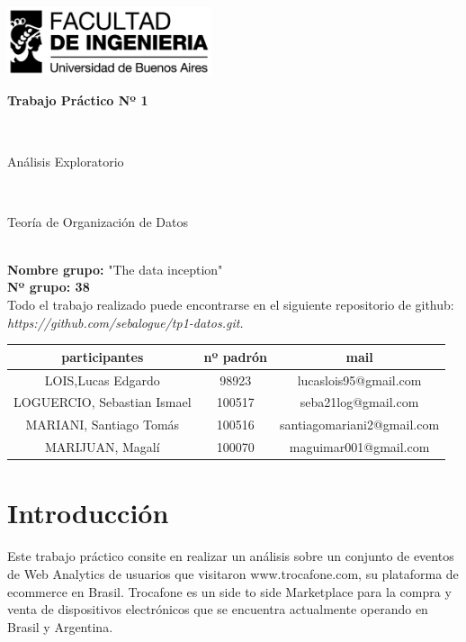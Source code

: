 \documentclass[titlepage,a4paper]{article}
\begin{document}
	\begin{titlepage}
		\hfill\includegraphics[width=6cm]{logofiuba.jpg}
		\center
		\vfill
		\vfill
		\begin{center}
			\begin{Huge}\textbf{Trabajo Práctico Nº 1}\end{Huge}\\
			\vfill
			\begin{huge}Análisis Exploratorio\end{huge}\\
			\vfill
			\begin{Large} Teoría de Organización de Datos\end{Large}\\

			\textbf{Nombre grupo:} "The data inception" \\
			\textbf{Nº grupo: 38}\\
				Todo el trabajo realizado puede encontrarse en el siguiente repositorio de github:\textit{ https://github.com/sebalogue/tp1-datos.git. }
	
			\vfill
			\begin{tabular}{|c|c|c|}
				\hline
				participantes & nº padrón & mail \\ \hline
				LOIS,Lucas Edgardo &98923 &  lucaslois95@gmail.com \\ \hline		
				LOGUERCIO, Sebastian Ismael &100517 &  seba21log@gmail.com \\ \hline
				MARIANI, Santiago Tomás &100516 &  santiagomariani2@gmail.com \\ \hline
				MARIJUAN, Magalí & 100070 & maguimar001@gmail.com\\ \hline
				
			\end{tabular}
			\vfill
			\vfill
			\vfill
			\vfill
			\vfill
			\vfill
		\end{center}
	
	\end{titlepage}

	\tableofcontents
	\newpage
	
	\section{Introducción}
	Este trabajo práctico consite en realizar un análisis sobre un conjunto de eventos de Web Analytics de usuarios que visitaron www.trocafone.com, su plataforma de ecommerce en Brasil. Trocafone es un side to side Marketplace para la compra y venta de dispositivos electrónicos que se encuentra actualmente operando en Brasil y Argentina.
	
\end{document}
